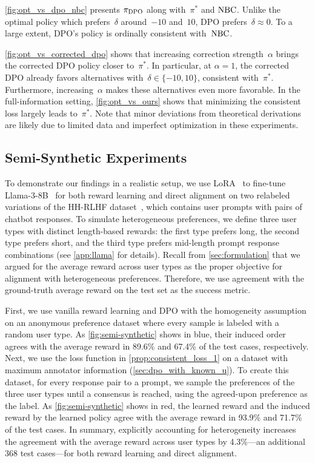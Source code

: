 \cref{fig:opt_vs_dpo_nbc} presents $\pi_{\rm DPO}$ along with~$\pi^*$ and ${\rm NBC}$. Unlike the optimal policy which prefers~$\delta$ around~$-10$ and~$10$, DPO prefers~$\delta \approx 0$. To a large extent, DPO's policy is ordinally consistent with~${\rm NBC}$.

\cref{fig:opt_vs_corrected_dpo} shows that increasing correction strength~$\alpha$ brings the corrected DPO policy closer to~$\pi^*$. In particular, at $\alpha=1$, the corrected DPO already favors alternatives with~$\delta \in \{-10, 10\}$, consistent with~$\pi^*$. Furthermore, increasing~$\alpha$ makes these alternatives even more favorable. In the full-information setting, \cref{fig:opt_vs_ours} shows that minimizing the consistent loss largely leads to~$\pi^*$.
Note that minor deviations from theoretical derivations are likely due to limited data and imperfect optimization in these experiments.



\subsection{Semi-Synthetic Experiments}
\label{subsec:exp:semi-synth}

To demonstrate our findings in a realistic setup, we use LoRA~\citep{lora} to fine-tune Llama-3-8B~\citep{llama3modelcard} for both reward learning and direct alignment on two relabeled variations of the HH-RLHF dataset~\citep{hh-rlhf}, which contains user prompts with pairs of chatbot responses.
To simulate heterogeneous preferences, we define three user types with distinct length-based rewards: the first type prefers long, the second type prefers short, and the third type prefers mid-length prompt response combinations (see \cref{app:llama} for details).
Recall from \cref{sec:formulation} that we argued for the average reward across user types as the proper objective for alignment with heterogeneous preferences.
Therefore, we use agreement with the ground-truth average reward on the test set as the success metric.

First, we use vanilla reward learning and DPO with the homogeneity assumption on an anonymous preference dataset where every sample is labeled with a random user type.
As \cref{fig:semi-synthetic} shows in blue, their induced order agrees with the average reward in 89.6\% and 67.4\% of the test cases, respectively.
Next, we use the loss function in \cref{prop:consistent_loss_1} on a dataset with maximum annotator information (\cref{sec:dpo_with_known_u}). 
To create this dataset, for every response pair to a prompt, we sample the preferences of the three user types until a consensus is reached, using the agreed-upon preference as the label.
As \cref{fig:semi-synthetic} shows in red, the learned reward and the induced reward by the learned policy agree with the average reward in 93.9\% and 71.7\% of the test cases.
In summary, explicitly accounting for heterogeneity increases the agreement with the average reward across user types by 4.3\%---an additional 368 test cases---for both reward learning and direct alignment.

